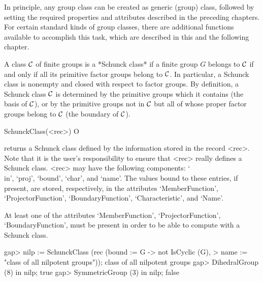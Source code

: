 
In principle, any group class can be created as generic (group) class,
followed by setting the required properties and attributes described in the
preceding chapters. For certain standard kinds of group classes, there are additional
functions available to accomplish this task, which are described in this and the
following chapter.


\null


A class $\cal C$ of finite groups is a *Schunck class* if a finite group
$G$ belongs to $\cal C$ if and only if all its primitive factor groups
belong to $\cal C$. In particular, a Schunck class is nonempty and closed
with respect to factor groups. By definition, a Schunck class $\cal C$ is
determined by the primitive groups which it contains (the basis of $\cal C$),
or by the primitive groups not in $\cal C$ but all of whose proper factor
groups belong to $\cal C$ (the boundary of $\cal C$).

\>SchunckClass(<rec>) O

returns a Schunck class defined by the information stored in the record
<rec>. Note that it is the user's responsibility to ensure that <rec> really
defines a Schunck class. <rec> may have the following components: `\\in',
`proj', `bound', `char', and `name'. The values bound to these entries, if
present, are stored, respectively, in the attributes `MemberFunction', `ProjectorFunction',
`BoundaryFunction', `Characteristic', and `Name'.

At least one of the attributes `MemberFunction', `ProjectorFunction', 
`BoundaryFunction', must be present in order to be able to compute
with a Schunck class. 

\beginexample
gap> nilp := SchunckClass (rec (bound := G -> not IsCyclic (G),
>        name := "class of all nilpotent groups"));
class of all nilpotent groups
gap> DihedralGroup (8) in nilp;
true
gap> SymmetricGroup (3) in nilp;
false
\endexample

